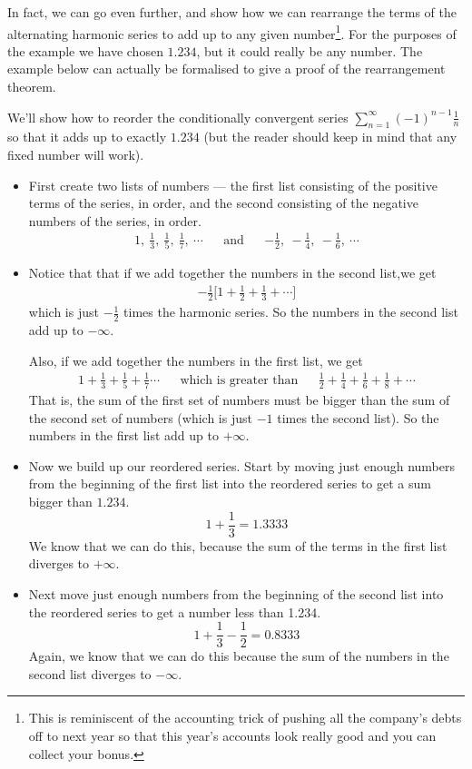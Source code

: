 In fact, we can go even further, and show how we can rearrange the terms
of the alternating harmonic series to add  up to any given number\footnote{This
is reminiscent of the accounting trick of pushing all the
company's debts off to next year so that this year's accounts look
really good and you can collect your bonus.}. For the purposes of the
example we have chosen $1.234$, but it could really be any number.
The example below can actually be formalised to give
a proof of the rearrangement theorem.
\begin{eg}\label{eg:SRccreorder}

We'll show how to  reorder the conditionally convergent series $\sum\limits_{n=1}^\infty(-1)^{n-1}\frac{1}{n}$ so
that it adds up to exactly $1.234$ (but the reader should keep in mind
that any fixed number will work).
\begin{itemize}
 \item First create two lists of numbers --- the first list consisting of the positive terms of the series, in order,
and the second consisting of the negative numbers of the series, in order.
\begin{align*}
1,\ \frac{1}{3},\ \frac{1}{5},\ \frac{1}{7},\ \cdots
&& \text{and}
&&
-\frac{1}{2},\ -\frac{1}{4},\ -\frac{1}{6},\ \cdots
\end{align*}
\item Notice that  that if we add together the numbers in the second
list,we get
\begin{align*}
-\frac{1}{2}\Big[1+\frac{1}{2}+\frac{1}{3}+\cdots\Big]
\end{align*}
which is just $-\frac{1}{2}$ times the harmonic series. So the numbers
in the second list add up to $-\infty$.

Also, if we add together the numbers in the first list, we get
\begin{align*}
1+\frac{1}{3}+\frac{1}{5}+\frac{1}{7}\cdots
&& \text{which is greater than}
&&\frac{1}{2}+\frac{1}{4}+\frac{1}{6}+\frac{1}{8}+\cdots
\end{align*}
That is, the sum of the first set of numbers must be bigger than
the sum of the second set of numbers (which is just $-1$ times the
second list). So the numbers in the first list add up to $+\infty$.

\item Now we build up our reordered series. Start by moving just
enough numbers from the beginning of the first list
into the reordered series to get a sum bigger than $1.234$.
\begin{equation*}
1+\frac{1}{3} = 1.3333
\end{equation*}
We know that we can do this, because the sum of the terms in
the first list diverges to $+\infty$.
\item Next move just enough numbers from the beginning of the second
list into the reordered series to get a number less than 1.234.
\begin{equation*}
1+\frac{1}{3}-\frac{1}{2} = 0.8333
\end{equation*}
Again, we know that we can do this because the sum of the numbers in
the second list diverges to $-\infty$.


\end{itemize}
\end{eg}
